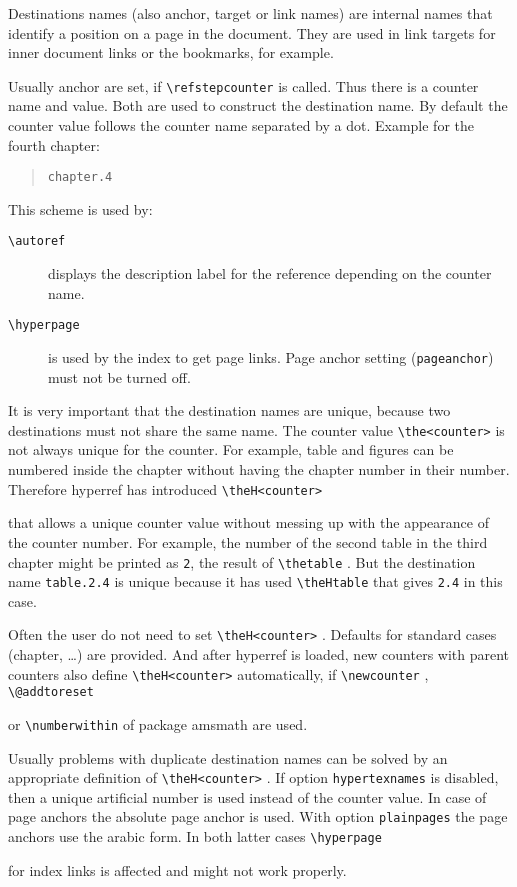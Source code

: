 \documentclass{article}
\newcommand*{\cs}[1]{%
  \texttt{\textbackslash #1}%
}
\newcommand*{\xpackage}[1]{\textsf{#1}}
\begin{document}
Destinations names (also anchor, target or link names) are internal
names that identify a position on a page in the document. They
are used in link targets for inner document links or the bookmarks,
for example.

Usually anchor are set, if \cs{refstepcounter} is called.
Thus there is a counter name and value. Both are used to
construct the destination name. By default the counter value
follows the counter name separated by a dot. Example for
the fourth chapter:
\begin{quote}
  \verb|chapter.4|
\end{quote}
This scheme is used by:
\begin{description}
\item[\cs{autoref}] displays the description label for the
  reference depending on the counter name.
\item[\cs{hyperpage}] is used by the index to get
page links. Page anchor setting (\verb|pageanchor|) must not
be turned off.
\end{description}

It is very important that the destination names are unique,
because two destinations must not share the same name.
The counter value \cs{the<counter>} is not always unique
for the counter. For example, table and figures can be numbered
inside the chapter without having the chapter number in their
number. Therefore \xpackage{hyperref} has introduced \cs{theH<counter>}
that allows a unique counter value without messing up with
the appearance of the counter number. For example, the number
of the second table in the third chapter might be printed
as \texttt{2}, the result of \cs{thetable}. But the
destination name \texttt{table.2.4} is unique because it
has used \cs{theHtable} that gives \verb|2.4| in this case.

Often the user do not need to set \cs{theH<counter>}. Defaults
for standard cases (chapter, \dots) are provided. And after \xpackage{hyperref}
is loaded, new counters with parent counters also define
\cs{theH<counter>} automatically, if \cs{newcounter}, \cs{@addtoreset}
or \cs{numberwithin} of package \xpackage{amsmath} are used.

Usually problems with duplicate destination names can be solved
by an appropriate definition of \cs{theH<counter>}. If option
\texttt{hypertexnames} is disabled, then a unique artificial
number is used instead of the counter value. In case of page
anchors the absolute page anchor is used. With option \texttt{plainpages}
the page anchors use the arabic form. In both latter cases \cs{hyperpage}
for index links is affected and might not work properly.
\end{document}
